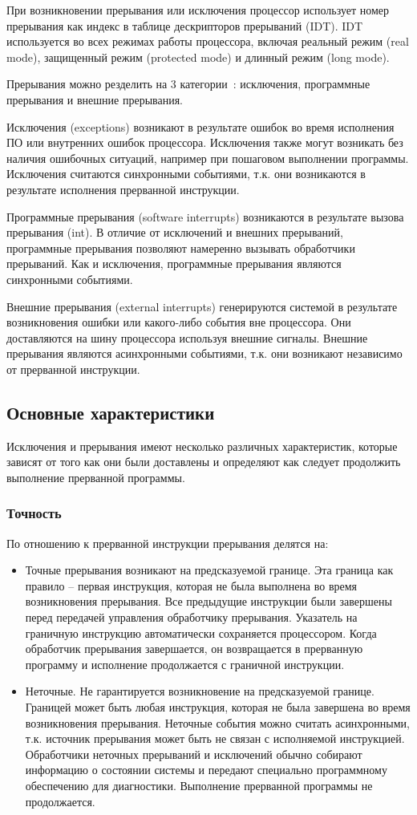 При возникновении прерывания или исключения процессор использует номер
прерывания как индекс в таблице дескрипторов прерываний (IDT). IDT
используется во всех режимах работы процессора, включая реальный режим (real
mode), защищенный режим (protected mode) и длинный режим (long mode).

Прерывания можно резделить на 3 категории~\cite{amd_pm_v2}: исключения,
программные прерывания и внешние прерывания.

Исключения (exceptions) возникают в результате ошибок во время исполнения ПО или внутренних
ошибок процессора. Исключения также могут возникать без наличия ошибочных
ситуаций, например при пошаговом выполнении программы. Исключения считаются
синхронными событиями, т.к. они возникаются в результате исполнения прерванной
инструкции.

Программные прерывания (software interrupts) возникаются в результате вызова прерывания (int). В
отличие от исключений и внешних прерываний, программные прерывания позволяют
намеренно вызывать обработчики прерываний. Как и исключения, программные
прерывания являются синхронными событиями.

Внешние прерывания (external interrupts) генерируются системой в результате возникновения ошибки
или какого-либо события вне процессора. Они доставляются на шину процессора
используя внешние сигналы. Внешние прерывания являются асинхронными событиями,
т.к. они возникают независимо от прерванной инструкции.

\subsection{Основные характеристики}
Исключения и прерывания имеют несколько различных характеристик, которые
зависят от того как они были доставлены и определяют как следует продолжить выполнение
прерванной программы.

\subsubsection*{Точность}
По отношению к прерванной инструкции прерывания делятся на:
\begin{itemize}
\item Точные прерывания возникают на предсказуемой границе. Эта граница
как правило -- первая инструкция, которая не была выполнена во время
возникновения прерывания. Все предыдущие инструкции были завершены перед
передачей управления обработчику прерывания. Указатель на граничную инструкцию
автоматически сохраняется процессором. Когда обработчик прерывания
завершается, он возвращается в прерванную программу и исполнение продолжается
с граничной инструкции.
\item Неточные. Не гарантируется возникновение на предсказуемой границе.
Границей может быть любая инструкция, которая не была завершена во время
возникновения прерывания. Неточные события можно считать асинхронными, т.к.
источник прерывания может быть не связан с исполняемой инструкцией.
Обработчики неточных прерываний и исключений обычно собирают информацию о
состоянии системы и передают специально программному обеспечению для
диагностики. Выполнение прерванной программы не продолжается.
\end{itemize}

